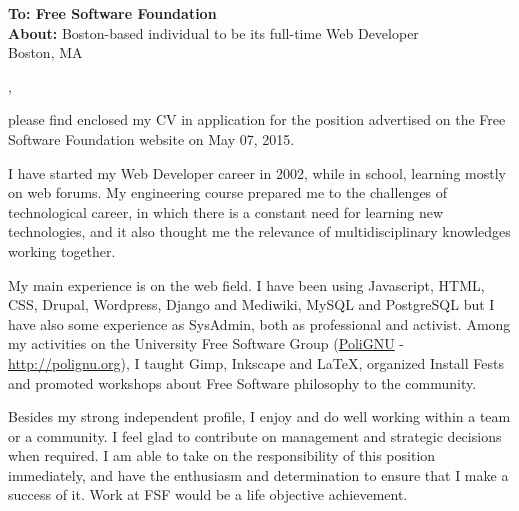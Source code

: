 \documentclass[11pt]{friggeri-cover-letter}
\begin{document}
\thispagestyle{empty}
%
%

\textbf{To: Free Software Foundation}\\
\textbf{About:} Boston-based individual to be its full-time Web Developer\\
Boston, MA

\vfill

,

\vfill

please find enclosed my CV in application for the position advertised on the Free Software Foundation website on May 07, 2015.


I have started my Web Developer career in 2002, while in school, learning mostly on web forums. My engineering course prepared me to the challenges of technological career, in which there is a constant need for learning new technologies, and it also thought me the relevance of multidisciplinary knowledges working together.

My main experience is on the web field. I have been using Javascript, HTML, CSS, Drupal, Wordpress, Django and Mediwiki, MySQL and PostgreSQL but I have also some experience as SysAdmin, both as professional and activist.
Among my activities on the University Free Software Group (\href{http://polignu.org}{PoliGNU} - \url{http://polignu.org}), I taught Gimp, Inkscape and LaTeX, organized Install Fests and promoted workshops about Free Software philosophy to the community.

Besides my strong independent profile, I enjoy and do well working within a team or a community. I feel glad to contribute on management and strategic decisions when required. I am able to take on the responsibility of this position immediately, and have the enthusiasm and determination to ensure that I make a success of it. Work at FSF would be a life objective achievement.
\end{document}
